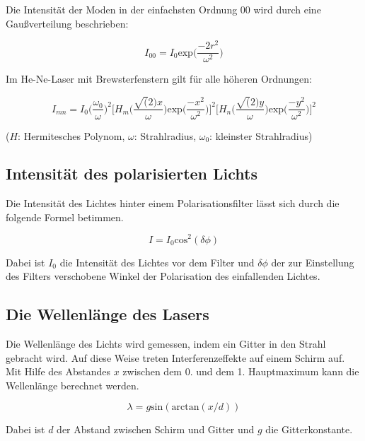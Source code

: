 Die Intensität der Moden in der einfachsten Ordnung 00 wird durch eine Gaußverteilung beschrieben:

\begin{equation}
  I_{00} = I_0 \text{exp} \biggl(\frac{-2r^2}{\omega^2}\biggr)
\end{equation}

Im He-Ne-Laser mit Brewsterfenstern gilt für alle höheren Ordnungen:

\begin{equation}
  I_{mn} = I_0 \biggl(\frac{\omega_0}{\omega}\biggr)^2 \biggl\lbrack H_m \biggl( \frac{\sqrt(2)x}{\omega} \biggr) \text{exp} \biggl( \frac{-x^2}{\omega^2} \biggr) \biggr\rbrack^2 \biggl\lbrack H_n \biggl( \frac{\sqrt(2)y}{\omega} \biggr) \text{exp} \biggl( \frac{-y^2}{\omega^2} \biggr) \biggr\rbrack^2
\end{equation}

($H$: Hermitesches Polynom, $\omega$: Strahlradius, $\omega_0$: kleinster Strahlradius)

\subsection{Intensität des polarisierten Lichts}

Die Intensität des Lichtes hinter einem Polarisationsfilter lässt sich durch die folgende Formel betimmen.

\begin{equation}
  I = I_0 \text{cos}^2(\delta\phi)
\label{eq:pol}
\end{equation}

Dabei ist $I_0$ die Intensität des Lichtes vor dem Filter und $\delta\phi$ der zur Einstellung des Filters verschobene Winkel
der Polarisation des einfallenden Lichtes.

\subsection{Die Wellenlänge des Lasers}

Die Wellenlänge des Lichts wird gemessen, indem ein Gitter in den Strahl gebracht wird. Auf diese Weise treten Interferenzeffekte
auf einem Schirm auf. Mit Hilfe des Abstandes $x$ zwischen dem 0. und dem 1. Hauptmaximum kann die Wellenlänge berechnet werden.

\begin{equation}
  \lambda = g \text{sin}(\text{arctan}(x/d))
\label{eq:wellen}
\end{equation}

Dabei ist $d$ der Abstand zwischen Schirm und Gitter und $g$ die Gitterkonstante.
